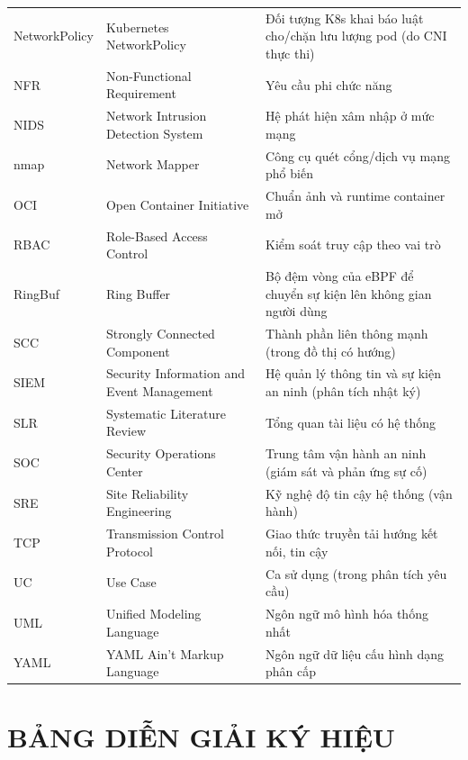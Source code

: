 \begin{longtable}{@{}p{3.0cm} >{\raggedright\arraybackslash}p{6cm} >{\raggedright\arraybackslash}p{5.5cm}@{}}
NetworkPolicy & Kubernetes NetworkPolicy & Đối tượng K8s khai báo luật cho/chặn lưu lượng pod (do CNI thực thi) \\
NFR     & Non-Functional Requirement & Yêu cầu phi chức năng \\
NIDS    & Network Intrusion Detection System & Hệ phát hiện xâm nhập ở mức mạng \\
nmap    & Network Mapper & Công cụ quét cổng/dịch vụ mạng phổ biến \\
OCI     & Open Container Initiative & Chuẩn ảnh và runtime container mở \\
RBAC    & Role-Based Access Control & Kiểm soát truy cập theo vai trò \\
RingBuf & Ring Buffer & Bộ đệm vòng của eBPF để chuyển sự kiện lên không gian người dùng \\
SCC     & Strongly Connected Component & Thành phần liên thông mạnh (trong đồ thị có hướng) \\
SIEM    & Security Information and Event Management & Hệ quản lý thông tin và sự kiện an ninh (phân tích nhật ký) \\
SLR     & Systematic Literature Review & Tổng quan tài liệu có hệ thống \\
SOC     & Security Operations Center & Trung tâm vận hành an ninh (giám sát và phản ứng sự cố) \\
SRE     & Site Reliability Engineering & Kỹ nghệ độ tin cậy hệ thống (vận hành) \\
TCP     & Transmission Control Protocol & Giao thức truyền tải hướng kết nối, tin cậy \\
UC      & Use Case & Ca sử dụng (trong phân tích yêu cầu) \\
UML     & Unified Modeling Language & Ngôn ngữ mô hình hóa thống nhất \\
YAML    & YAML Ain't Markup Language & Ngôn ngữ dữ liệu cấu hình dạng phân cấp \\

\end{longtable}

\clearpage


\chapter*{BẢNG DIỄN GIẢI KÝ HIỆU}

